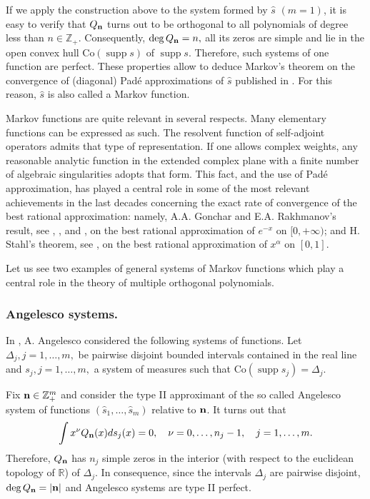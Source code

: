 \documentclass{amsart}
\theoremstyle{definition}
\theoremstyle{remark}
\newcommand{\supp}{\operatorname{supp }}
\begin{document}
If we apply the construction above to the system formed by $\widehat{s}\,\, (m=1)$, it is easy to verify that $Q_{\bf n}$ turns out to be orthogonal to all polynomials of degree less than $n \in {\mathbb{Z}}_+$. Consequently, $\deg Q_{\bf n} = n,$ all its zeros are simple and lie in the open convex hull $\mbox{Co}(\supp s)$ of $\supp s$. Therefore, such systems of one function are perfect. These properties allow to deduce Markov's theorem on the convergence of (diagonal) Pad\'e approximations of $\widehat{s}$   published in \cite{Mar}. For this reason, $\widehat{s}$ is also called a Markov function.

Markov functions are quite relevant in several respects. Many elementary functions can be expressed as such. The resolvent function of self-adjoint operators admits that type of representation. If one allows complex weights, any reasonable analytic function in the extended complex plane with a finite number of algebraic singularities adopts that form. This fact, and the use of Pad\'e approximation, has played a central role in some of the most relevant achievements in the last decades concerning the exact rate of convergence of the best rational approximation: namely, A.A. Gonchar and E.A. Rakhmanov's result, see \cite{GR1}, \cite{Gon1}, and \cite{Apt3}, on the best rational approximation of $e^{-x}$ on $[0,+\infty)$; and H. Stahl's theorem, see \cite{S}, on the best rational approximation of $x^{\alpha}$ on $[0,1]$.


Let us see two examples of general systems of Markov functions which play a central role in the theory of multiple orthogonal polynomials.

\subsubsection{Angelesco systems.} In \cite{Ang}, A. Angelesco considered the following systems of functions. Let $\Delta_j, j=1,\ldots,m,$ be pairwise disjoint bounded intervals contained in the real line and $s_j, j=1,\ldots,m,$ a system of measures such that $\mbox{Co}(\supp s_j) = \Delta_j.$

Fix ${\bf n} \in {\mathbb{Z}}_+^{m}$ and consider the type II approximant of the so called Angelesco system of functions $(\widehat{s}_1,\ldots,\widehat{s}_m)$ relative to $\bf n$. It turns out that
\[ \int x^{\nu} Q_{\bf n}(x) ds_j(x) =0, \quad \nu = 0,\ldots,n_j -1,\quad j=1,\ldots,m.
\]
Therefore, $Q_{\bf n}$ has $n_j$ simple zeros in the interior (with respect to the euclidean topology of ${\mathbb{R}}$) of $\Delta_j$. In consequence, since the intervals $\Delta_j$ are pairwise disjoint, $\deg Q_{\bf n} = |{\bf n}|$ and Angelesco systems are type II perfect.
\end{document}
